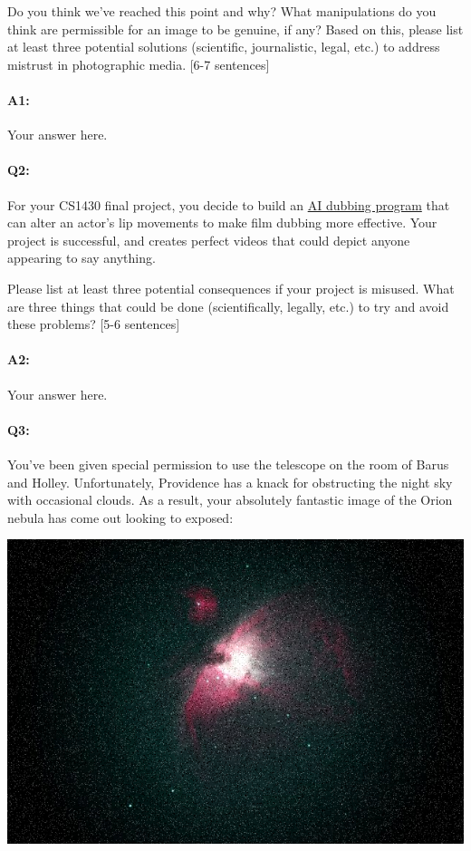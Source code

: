 Do you think we've reached this point and why? What manipulations do you think are permissible for an image to be genuine, if any? Based on this, please list at least three potential solutions (scientific, journalistic, legal, etc.) to address mistrust in photographic media. [6-7 sentences]

\paragraph{A1:} Your answer here.
\pagebreak
\paragraph{Q2:} For your CS1430 final project, you decide to build an \href{https://respeecher.medium.com/what-is-synthetic-film-dubbing-ai-deepfake-technology-explained-9f6118532e8c}{AI dubbing program} that can alter an actor's lip movements to make film dubbing more effective. Your project is successful, and creates perfect videos that could depict anyone appearing to say anything.

Please list at least three potential consequences if your project is misused. What are three things that could be done (scientifically, legally, etc.) to try and avoid these problems? [5-6 sentences]

\paragraph{A2:} Your answer here.
\pagebreak

\paragraph{Q3:} You've been given special permission to use the telescope on the room of Barus and Holley. Unfortunately, Providence has a knack for obstructing the night sky with occasional clouds. As a result, your absolutely fantastic image of the Orion nebula has come out looking to exposed:

\includegraphics[width=\linewidth]{images/orion-noise.png}


